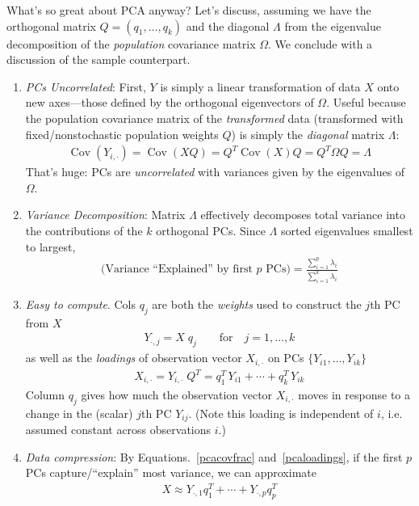 \documentclass[12pt]{book}
\numberwithin{equation}{section} %
\theoremstyle{plain}
\theoremstyle{definition}
\theoremstyle{remark}
\newcommand{\Cov}{\operatorname{Cov}}
\begin{document}
\clearpage
What's so great about PCA anyway?
Let's discuss, assuming we have the orthogonal matrix
$Q=(q_1,\ldots,q_k)$ and the diagonal $\Lambda$ from the eigenvalue
decomposition of the \emph{population} covariance matrix $\Omega$. We
conclude with a discussion of the sample counterpart.
\begin{enumerate}[label=(\roman*)]
  \item
    \emph{PCs Uncorrelated}:
    First, $Y$ is simply a linear transformation of data $X$ onto new
    axes---those defined by the orthogonal eigenvectors of $\Omega$.
    Useful because the population covariance matrix of the
    \emph{transformed} data (transformed with fixed/nonstochastic
    population weights $Q$) is simply the \emph{diagonal} matrix
    $\Lambda$:
    \begin{align}
      \Cov(Y_{i,\cdot}) = \Cov(XQ) = Q^T\Cov(X)Q=
      Q^T \Omega Q = \Lambda
      \label{pcacov}
    \end{align}
    That's huge: PCs are \emph{uncorrelated} with variances given by the
    eigenvalues of $\Omega$.

  \item \emph{Variance Decomposition}:
    Matrix $\Lambda$ effectively decomposes total variance into the
    contributions of the $k$ orthogonal PCs. Since $\Lambda$ sorted
    eigenvalues smallest to largest,
    \begin{align}
      \text{(Variance ``Explained'' by first $p$ PCs)}
      = \frac{\sum_{i=1}^p \lambda_i}{\sum_{i=1}^k\lambda_i}
      \label{pcacovfrac}
    \end{align}

  \item
    \emph{Easy to compute}.
    Cols $q_j$ are both the \emph{weights} used to construct the $j$th
    PC from $X$
    \begin{align*}
      Y_{\cdot,j} = X\;q_j
      \qquad \text{for}\quad j=1,\ldots,k
    \end{align*}
    as well as the \emph{loadings} of observation vector $X_{i,\cdot}$
    on PCs $\{Y_{i1},\ldots,Y_{ik}\}$
    \begin{align}
      X_{i,\cdot} = Y_{i,\cdot}\;Q^T
      = q_1^T \,Y_{i1} + \cdots + q_k^T \,Y_{ik}
      \label{pcaloadings}
    \end{align}
    Column $q_j$ gives how much the observation vector $X_{i,\cdot}$
    moves in response to a change in the (scalar) $j$th PC $Y_{ij}$.
    (Note this loading is independent of $i$, i.e. assumed constant
    across observations $i$.)

  \item
    \emph{Data compression}: By Equations.~\ref{pcacovfrac}
    and~\ref{pcaloadings}, if the first $p$ PCs capture/``explain'' most
    variance, we can approximate
    \begin{align}
      X \approx
      Y_{\cdot,1}q_1^T + \cdots + Y_{\cdot,p}q_p^T
    \end{align}
\end{enumerate}
\end{document}
